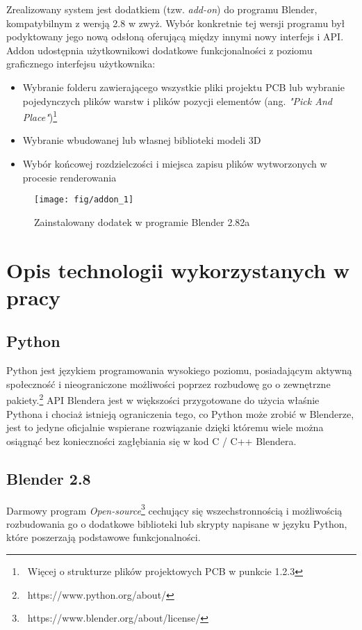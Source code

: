 \documentclass[brudnopis]{xmgr}
\begin{document}
Zrealizowany system jest dodatkiem (tzw. \emph{add-on}) do programu Blender, kompatybilnym z wersją 2.8 w zwyż. Wybór konkretnie tej wersji programu był podyktowany jego nową odsłoną oferującą między innymi nowy interfejs i API. Addon udostępnia użytkownikowi dodatkowe funkcjonalności z poziomu graficznego interfejsu użytkownika:
\begin{itemize}
\item Wybranie folderu zawierającego wszystkie pliki projektu PCB lub wybranie pojedynczych plików warstw i  plików pozycji elementów (ang. \emph{"Pick And Place"})\footnote{~Więcej o strukturze plików projektowych PCB w punkcie 1.2.3}
\item Wybranie wbudowanej lub własnej biblioteki modeli 3D
\item Wybór końcowej rozdzielczości i miejsca zapisu plików wytworzonych w procesie renderowania
\end{itemize}

\begin{figure}
\centering
\texttt{[image: fig/addon\_1]}
\caption{Zainstalowany dodatek w programie Blender 2.82a\label{RYS.2}}
\end{figure}

\section {Opis technologii wykorzystanych w pracy}

\subsection{Python}
Python jest językiem programowania wysokiego poziomu, posiadającym aktywną społeczność i nieograniczone możliwości poprzez rozbudowę go o zewnętrzne pakiety.\footnote {~https://www.python.org/about/} API Blendera jest w większości przygotowane do użycia właśnie Pythona i chociaż istnieją ograniczenia tego, co Python może zrobić w Blenderze, jest to jedyne oficjalnie wspierane rozwiązanie dzięki któremu wiele można osiągnąć bez konieczności zagłębiania się w kod C / C++ Blendera.

\subsection {Blender 2.8}
Darmowy program \emph{Open-source}\footnote{~https://www.blender.org/about/license/} cechujący się wszechstronnością i możliwością rozbudowania go o dodatkowe biblioteki lub skrypty napisane w języku Python, które poszerzają podstawowe funkcjonalności.
\end{document}
